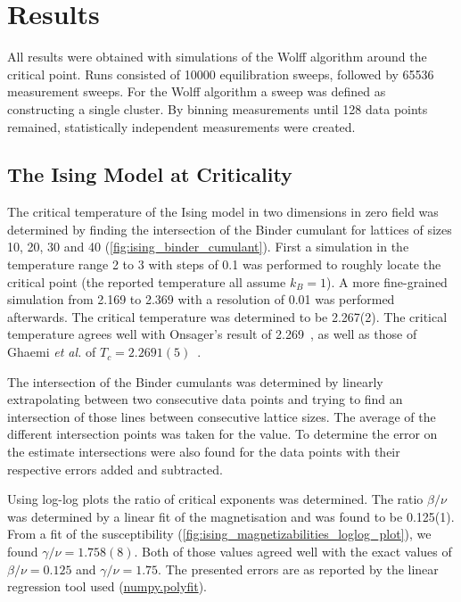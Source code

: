 \documentclass[11pt, a4paper]{report} %
\begin{document}
\chapter{Results}

All results were obtained with simulations of the Wolff algorithm around the critical point.
Runs consisted of 10000 equilibration sweeps, followed by 65536 measurement sweeps.
For the Wolff algorithm a sweep was defined as constructing a single cluster.
By binning measurements until 128 data points remained, statistically independent measurements were created.

\section{The Ising Model at Criticality}

The critical temperature of the Ising model in two dimensions in zero field was determined by finding the intersection of the Binder cumulant for lattices of sizes 10, 20, 30 and 40 (\cref{fig:ising_binder_cumulant}).
First a simulation in the temperature range 2 to 3 with steps of 0.1 was performed to roughly locate the critical point (the reported temperature all assume \(k_B = 1\)).
A more fine-grained simulation from 2.169 to 2.369 with a resolution of 0.01 was performed afterwards.
The critical temperature was determined to be 2.267(2).
The critical temperature agrees well with Onsager's result of 2.269~\cite{onsager:1944}, as well as those of Ghaemi \textit{et al.} of \(T_c = 2.2691(5)\)~\cite{ghaemi:2001}.

The intersection of the Binder cumulants was determined by linearly extrapolating between two consecutive data points and trying to find an intersection of those lines between consecutive lattice sizes.
The average of the different intersection points was taken for the value.
To determine the error on the estimate intersections were also found for the data points with their respective errors added and subtracted.

Using log-log plots the ratio of critical exponents was determined.
The ratio \(\beta/\nu\) was determined by a linear fit of the magnetisation and was found to be 0.125(1).
From a fit of the susceptibility (\cref{fig:ising_magnetizabilities_loglog_plot}), we found \(\gamma/\nu = 1.758(8)\).
Both of those values agreed well with the exact values of \(\beta/\nu = 0.125\) and \(\gamma/\nu = 1.75\).
The presented errors are as reported by the linear regression tool used (\url{numpy.polyfit}).
\end{document}
